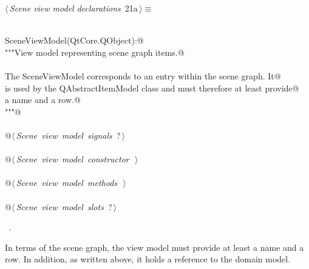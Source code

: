 \documentclass[
    a4paper,      %
    10pt,         %
    openright,    %
    notitlepage,  %
    parskip=half, %
]{scrreprt}       %
\theoremstyle{definition}                    %
\begin{document}
\begin{flushleft} \small
\begin{minipage}{\linewidth}\label{scrap12}\raggedright\small
{} $\langle\,${\itshape Scene view model declarations}\nobreak\ {\footnotesize {21a}}$\,\rangle\equiv$
\vspace{-1ex}
\begin{list}{}{} \item
\mbox{}\lstinline@@\\
\mbox{}\lstinline@class SceneViewModel(QtCore.QObject):@\\
\mbox{}\lstinline@    """View model representing scene graph items.@\\
\mbox{}\lstinline@@\\
\mbox{}\lstinline@    The SceneViewModel corresponds to an entry within the scene graph. It@\\
\mbox{}\lstinline@    is used by the QAbstractItemModel class and must therefore at least provide@\\
\mbox{}\lstinline@    a name and a row.@\\
\mbox{}\lstinline@    """@\\
\mbox{}\lstinline@@\\
\mbox{}\lstinline@    @\hbox{$\langle\,${\itshape Scene view model signals}\nobreak\ {\footnotesize ?}$\,\rangle$}\lstinline@@\\
\mbox{}\lstinline@@\\
\mbox{}\lstinline@    @\hbox{$\langle\,${\itshape Scene view model constructor}\nobreak\ {\footnotesize {}}$\,\rangle$}\lstinline@@\\
\mbox{}\lstinline@@\\
\mbox{}\lstinline@    @\hbox{$\langle\,${\itshape Scene view model methods}\nobreak\ {\footnotesize {}}$\,\rangle$}\lstinline@@\\
\mbox{}\lstinline@@\\
\mbox{}\lstinline@    @\hbox{$\langle\,${\itshape Scene view model slots}\nobreak\ {\footnotesize ?}$\,\rangle$}\lstinline@@\\
\mbox{}\lstinline@@{\NWsep}
\end{list}
\vspace{-1.5ex}
\footnotesize
\begin{list}{}{\setlength{\itemsep}{-\parsep}\setlength{\itemindent}{-\leftmargin}}
\item \NWtxtMacroRefIn\ .

\item{}
\end{list}
\end{minipage}\vspace{4ex}
\end{flushleft}
In terms of the scene graph, the view model must provide at least a name and a
row. In addition, as written above, it holds a reference to the domain model.
\end{document}
